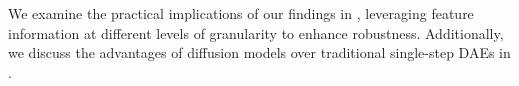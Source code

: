 We examine the practical implications of our findings in , leveraging feature information at different levels of granularity to enhance robustness. Additionally, we discuss the advantages of diffusion models over traditional single-step DAEs in .





